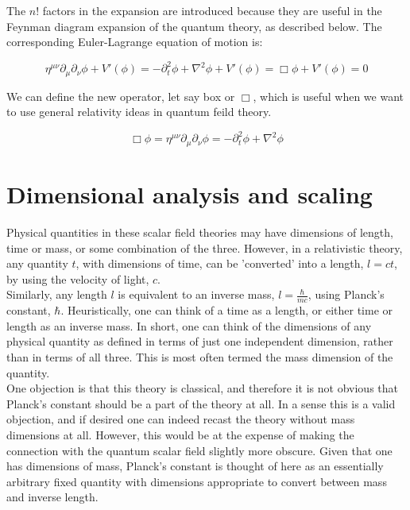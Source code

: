 The $n!$ factors in the expansion are introduced because they are useful in the Feynman diagram expansion of the quantum theory, as described below. The corresponding Euler-Lagrange equation of motion is:

\begin{equation}
    \eta^{\mu\nu}\partial_\mu\partial_\nu\phi + V'(\phi)= - \partial^2_t\phi + \nabla^2\phi + V'(\phi) = \Box\phi + V'(\phi)= 0
\end{equation}

We can define the new operator, let say box or $\Box$, which is useful when we want to use general relativity ideas in quantum feild theory.

\begin{equation}
    \Box\phi = \eta^{\mu\nu}\partial_\mu\partial_\nu\phi = - \partial^2_t\phi + \nabla^2\phi 
\end{equation}


\section{Dimensional analysis and scaling}

Physical quantities in these scalar field theories may have dimensions of length, time or mass, or some combination of the three. However, in a relativistic theory, any quantity $t$, with dimensions of time, can be 'converted' into a length, $l=ct$, by using the velocity of light, $c$.\\

Similarly, any length $l$ is equivalent to an inverse mass, $l=\frac{\hbar}{mc}$, using Planck's constant, $\hbar$. Heuristically, one can think of a time as a length, or either time or length as an inverse mass. In short, one can think of the dimensions of any physical quantity as defined in terms of just one independent dimension, rather than in terms of all three. This is most often termed the mass dimension of the quantity.\\

One objection is that this theory is classical, and therefore it is not obvious that Planck's constant should be a part of the theory at all. In a sense this is a valid objection, and if desired one can indeed recast the theory without mass dimensions at all. However, this would be at the expense of making the connection with the quantum scalar field slightly more obscure. Given that one has dimensions of mass, Planck's constant is thought of here as an essentially arbitrary fixed quantity with dimensions appropriate to convert between mass and inverse length.\\

